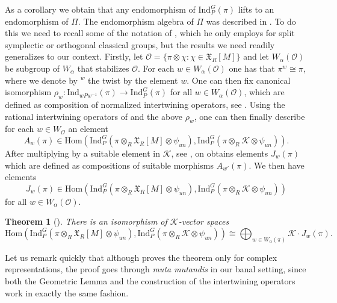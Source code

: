 \documentclass[10pt,a4paper]{article}
\newtheorem{theorem}{Theorem}
\theoremstyle{remark}
\theoremstyle{definition}
\newcommand{\ip}{\mathrm{Ind}_P^G}
\newcommand{\ho}{\mathrm{Hom}}
\newcommand{\id}{\mathrm{Ind}}
\newcommand{\xc}{\mathfrak{X}}
\newcommand{\un}{_{un}}
\newcommand{\ra}{\rightarrow}
\newcommand{\scrO}{\mathscr{O}}
\newcommand{\cK}{\mathcal{K}}
\begin{document}
As a corollary we obtain that any endomorphism of $\ip(\pi)$ lifts to an endomorphism of $\Pi$. The endomorphism algebra of $\Pi$ was described in \cite{Heiermann2011}. To do this we need to recall some of the notation of \cite{Heiermann2011}, which he only employs for split symplectic or orthogonal classical groups, but the results we need readily generalizes to our context. 
Firstly, let $\scrO=\{\pi\otimes \chi:\chi\in\xc_R[M]\}$ and let $W_\alpha(\scrO)$ be subgroup of $W_\alpha$ that stabilizes $\scrO$. For each $w\in W_\alpha(\scrO)$ one has that $\pi^w\cong \pi$, where we denote by ${}^w$ the twist by the element $w$. One can then fix canonical isomorphism $\rho_w\colon \id_{wPw^{-1}}(\pi)\ra\ip(\pi)$ for all $w\in W_\alpha(\scrO)$, which are defined as composition of normalized intertwining operators, see \cite[2.4, 2.5]{Heiermann2011}.
Using the rational intertwining operators of \cite{Dat05} and the above $\rho_w$, one can then finally describe for each $w\in W_{\scrO}$ an element \[A_w(\pi)\in\ho(\ip(\pi\otimes_R\xc_R[M]\otimes\psi\un),\ip(\pi\otimes_R\cK\otimes\psi\un)).\] 
After multiplying by a suitable element in $\cK$, see \cite[4.6]{Heiermann2011}, on obtains elements $J_w(\pi)$ which are defined as compositions of suitable morphisms $A_{w'}(\pi)$. We then have elements \[J_w(\pi)\in \ho(\ip(\pi\otimes_R\xc_R[M]\otimes\psi\un),\ip(\pi\otimes_R\cK\otimes\psi\un))\] for all $w\in W_\alpha(\scrO)$.
\begin{theorem}[{\cite[Theorem 4.9]{Heiermann2011}}]\label{T:Heier}
    There is an isomorphism of $\cK$-vector spaces
    \[\ho(\ip(\pi\otimes_R\xc_R[M]\otimes\psi\un),\ip(\pi\otimes_R\cK\otimes\psi\un))\cong  \bigoplus_{w\in W_\alpha(\pi)}\cK\cdot J_w(\pi).\]
\end{theorem}
Let us remark quickly that although \cite{Heiermann2011} proves the theorem only for complex representations, the proof goes through \emph{muta mutandis} in our banal setting, since both the Geometric Lemma and the construction of the intertwining operators work in exactly the same fashion.
\end{document}
